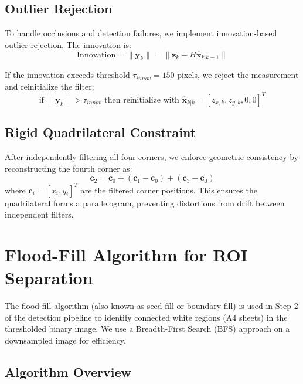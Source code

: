 \documentclass[9pt,a4paper,twocolumn,twoside]{tau-class/tau}
\begin{document}
    \subsection{Outlier Rejection}

    To handle occlusions and detection failures, we implement innovation-based outlier rejection. The innovation is:
    \begin{equation}
        \text{Innovation} = \|\mathbf{y}_k\| = \|\mathbf{z}_k - H \hat{\mathbf{x}}_{k|k-1}\|
    \end{equation}

    If the innovation exceeds threshold $\tau_{innov} = 150$ pixels, we reject the measurement and reinitialize the filter:
    \begin{equation}
        \text{if } \|\mathbf{y}_k\| > \tau_{innov} \text{ then reinitialize with } \hat{\mathbf{x}}_{k|k} = [z_{x,k}, z_{y,k}, 0, 0]^T
    \end{equation}

    \subsection{Rigid Quadrilateral Constraint}

    After independently filtering all four corners, we enforce geometric consistency by reconstructing the fourth corner as:
    \begin{equation}
        \mathbf{c}_2 = \mathbf{c}_0 + (\mathbf{c}_1 - \mathbf{c}_0) + (\mathbf{c}_3 - \mathbf{c}_0)
    \end{equation}
    where $\mathbf{c}_i = [x_i, y_i]^T$ are the filtered corner positions. This ensures the quadrilateral forms a parallelogram, preventing distortions from drift between independent filters.

\section{Flood-Fill Algorithm for ROI Separation}

    The flood-fill algorithm (also known as seed-fill or boundary-fill) is used in Step 2 of the detection pipeline to identify connected white regions (A4 sheets) in the thresholded binary image. We use a Breadth-First Search (BFS) approach on a downsampled image for efficiency.

    \subsection{Algorithm Overview}
\end{document}
